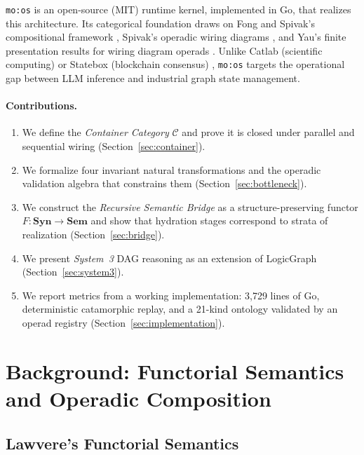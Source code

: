 \documentclass[submission,copyright,creativecommons]{eptcs}
\begin{document}
\texttt{mo:os} is an open-source (MIT) runtime kernel, implemented in Go,
that realizes this architecture. Its categorical foundation draws on Fong and
Spivak's compositional framework \cite{fong2018}, Spivak's operadic wiring
diagrams \cite{spivak2013,spivak2013operad}, and Yau's finite presentation
results for wiring diagram operads \cite{yau2018}. Unlike Catlab (scientific
computing) or Statebox (blockchain consensus) \cite{statebox2019}, \texttt{mo:os}
targets the operational gap between LLM inference and industrial graph
state management.

\paragraph{Contributions.}
\begin{enumerate}
  \item We define the \emph{Container Category} $\mathcal{C}$ and prove it is
        closed under parallel and sequential wiring (Section~\ref{sec:container}).
  \item We formalize four invariant natural transformations and the operadic
        validation algebra that constrains them (Section~\ref{sec:bottleneck}).
  \item We construct the \emph{Recursive Semantic Bridge} as a
        structure-preserving functor $F\colon \mathbf{Syn} \to \mathbf{Sem}$
        and show that hydration stages correspond to strata of realization
        (Section~\ref{sec:bridge}).
  \item We present \emph{System~3} DAG reasoning as an extension of
        LogicGraph \cite{logicgraph2025} (Section~\ref{sec:system3}).
  \item We report metrics from a working implementation: 3{,}729 lines of Go,
        deterministic catamorphic replay, and a 21-kind ontology validated by
        an operad registry (Section~\ref{sec:implementation}).
\end{enumerate}

\section{Background: Functorial Semantics and Operadic Composition}
\label{sec:background}

\subsection{Lawvere's Functorial Semantics}
\end{document}
